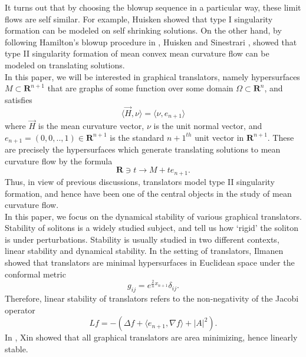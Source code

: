 \documentclass[pdflatex,sn-mathphys-num]{sn-jnl}%
\begin{document}
It turns out that by choosing the blowup sequence in a particular way, these limit flows are self similar. For example, Huisken \cite{Huisken1990AsymptoticbehaviorFS} showed that type I singularity formation can be modeled on self shrinking solutions. On the other hand, by following Hamilton's blowup procedure in \cite{hamilton1995formation}, Huisken and Sinestrari \cite{huisken1999mean}, \cite{huisken1999convexity} showed that type II singularity formation of mean convex mean curvature flow can be modeled on translating solutions.\\

In this paper, we will be interested in graphical translators, namely hypersurfaces $M \subset \mathbf{R}^{n+1}$ that are graphs of some function over some domain $\Omega \subset \mathbf{R}^n$, and satisfies
\begin{equation}\label{translator equation}
    \langle \Vec{H}, \nu\rangle  = \langle \nu, e_{n+1}\rangle 
\end{equation}
where $\Vec{H}$ is the mean curvature vector, $\nu$ is the unit normal vector, and $e_{n+1} = (0,0,..,1) \in \mathbf{R}^{n+1}$ is the standard $n+1^{th}$ unit vector in $\mathbf{R}^{n+1}$. These are precisely the hypersurfaces which generate translating solutions to mean curvature flow by the formula 
\begin{equation}
    \mathbf{R}\ni t \to M + te_{n+1}.
\end{equation}
 Thus, in view of previous discussions, translators model type II singularity formation, and hence have been one of the central objects in the study of mean curvature flow. \\

In this paper, we focus on the dynamical stability of various graphical translators. Stability of solitons is a widely studied subject, and tell us how `rigid' the soliton is under perturbations. Stability is usually studied in two different contexts, linear stability and dynamical stability. In the setting of translators, Ilmanen \cite{ilmanen1994elliptic} showed that translators are minimal hypersurfaces in Euclidean space under the conformal metric
\begin{equation}
    g_{ij} = e^{\frac{2}{n}x_{n+1}}\delta_{ij}.
\end{equation}
Therefore, linear stability of translators refers to the non-negativity of the Jacobi operator
\begin{equation}
    Lf = -(\Delta f + \langle e_{n+1}, \nabla f\rangle  + |A|^2).
\end{equation}
In \cite{Xin2015-ei}, Xin showed that all graphical translators are area minimizing, hence linearly stable.\\
\end{document}
